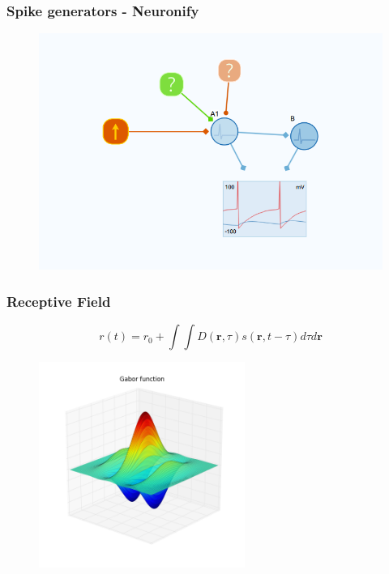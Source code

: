 \documentclass{beamer}
\begin{document}
\begin{frame}
	\frametitle{Spike generators - Neuronify}
	\begin{figure}
		\includegraphics[width = \textwidth]{figures/two_neurons_noise.png}
	\end{figure}
\end{frame}





\begin{frame}
 \frametitle{Receptive Field}


\begin{equation}
r(t) = r_0 + \displaystyle \int \int D(\mathbf{r},\tau) s(\mathbf{r},t-\tau) d\tau d\mathbf{r}
\end{equation}


\begin{figure}
 \includegraphics[width = 0.6\textwidth]{figures/gabor.png}
 \end{figure}

\end{frame}
\end{document}
